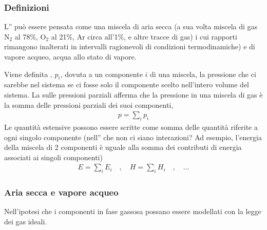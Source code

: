 \documentclass[letterpaper,10pt,italian]{jupyterBook}
\begin{document}
\subsubsection{Definizioni}
\label{\detokenize{ch/thermodynamics/humid-air:definizioni}}
\sphinxAtStartPar
L” può essere pensata come una miscela di aria secca (a sua volta miscela di gas N\(_2\) al 78\%, O\(_2\) al 21\%, Ar circa all’1\%, e altre tracce di gas) i cui rapporti rimangono inalterati in intervalli ragionevoli di condizioni termodinamiche) e di vapore acqueo, acqua allo stato di vapore.

\sphinxAtStartPar
Viene definita , \(p_i\), dovuta a un componente \(i\) di una miscela, la pressione che ci sarebbe nel sistema se ci fosse solo il componente scelto nell’intero volume del sistema. La  sulle pressioni parziali afferma che la pressione in una miscela di gas è la somma delle pressioni parziali dei suoi componenti,
\begin{equation*}
\begin{split}p = \sum_i p_i\end{split}
\end{equation*}
\sphinxAtStartPar
Le quantità estensive possono essere scritte come somma delle quantità riferite a ogni singolo componente (nell” che non ci siano interazioni? Ad esempio, l’energia della miscela di 2 componenti è uguale alla somma dei contributi di energia associati ai singoli componenti)
\begin{equation*}
\begin{split}E = \sum_i E_i \quad , \quad H = \sum_i H_i \quad , \quad \dots\end{split}
\end{equation*}

\subsubsection{Aria secca e vapore acqueo}
\label{\detokenize{ch/thermodynamics/humid-air:aria-secca-e-vapore-acqueo}}
\sphinxAtStartPar
Nell’ipotesi che i componenti in fase gassosa possano essere modellati con la legge dei gas ideali.
\end{document}
